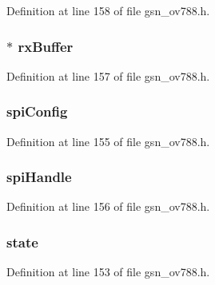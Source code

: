 Definition at line 158 of file gsn\_\-ov788.h.

\hypertarget{a00179_a1ce88e0bfbac38218165129d8ffdd2b5}{
\subsubsection[{rxBuffer}]{$\ast$ {\bf rxBuffer}}}
\label{a00179_a1ce88e0bfbac38218165129d8ffdd2b5}


Definition at line 157 of file gsn\_\-ov788.h.

\hypertarget{a00179_aaa45f93abc04d3ee7a70c0e8f5f382f3}{
\subsubsection[{spiConfig}]{ {\bf spiConfig}}}
\label{a00179_aaa45f93abc04d3ee7a70c0e8f5f382f3}


Definition at line 155 of file gsn\_\-ov788.h.

\hypertarget{a00179_a7e0135436cf308167541ff8fbb5756f4}{
\subsubsection[{spiHandle}]{ {\bf spiHandle}}}
\label{a00179_a7e0135436cf308167541ff8fbb5756f4}


Definition at line 156 of file gsn\_\-ov788.h.

\hypertarget{a00179_ae96391255eaada679c3f1a843b5530a5}{
\subsubsection[{state}]{ {\bf state}}}
\label{a00179_ae96391255eaada679c3f1a843b5530a5}


Definition at line 153 of file gsn\_\-ov788.h.

